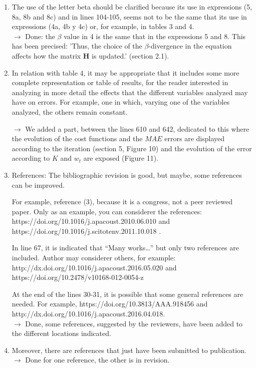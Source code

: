 \documentclass[10pt]{article}
\begin{document}
\begin{enumerate}
\item The use of the letter beta should be clarified because its use in expressions (5, 8a, 8b and 8c) and in lines 104-105, seems not to be the same that its use in expressions (4a, 4b y 4c) or, for example, in tables 3 and 4.\\
$\rightarrow$ Done: the $\beta$ value in 4 is the same that in the expressions 5 and 8. This has been precised: 'Thus, the choice of the $\beta$-divergence in the equation affects how the matrix $\mathbf{H}$ is updated.' (section 2.1).

\item In relation with table 4, it may be appropriate that it includes some more complete representation or table of results, for the reader interested in analyzing in more detail the effects that the different variables analyzed may have on errors. For example, one in which, varying one of the variables analyzed, the others remain constant.

$\rightarrow$ We added a part, between the lines 610 and 642, dedicated to this where the evolution of the cost functions and the $MAE$ errors are displayed according to the iteration (section 5, Figure 10) and the evolution of the error according to $K$ and $w_t$ are exposed (Figure 11).

\item References: The bibliographic revision is good, but maybe, some references can be improved.

For example, reference (3), because it is a congress, not a peer reviewed paper. Only as an example, you can considerer the references: https://doi.org/10.1016/j.apacoust.2010.06.010 and https://doi.org/10.1016/j.scitotenv.2011.10.018 .

In line 67, it is indicated that “Many works…” but only two references are included. Author may considerer others, for example: 
http://dx.doi.org/10.1016/j.apacoust.2016.05.020 and https://doi.org/10.2478/v10168-012-0054-z

At the end of the lines 30-31, it is possible that some general references are needed. For example, 
https://doi.org/10.3813/AAA.918456 and http://dx.doi.org/10.1016/j.apacoust.2016.04.018.\\
$\rightarrow$ Done, some references, suggested by the reviewers, have been added to the different locations indicated.


\item Moreover, there are references that just have been submitted to publication. \\
$\rightarrow$ Done for one reference, the other is in revision.

\end{enumerate}
\end{document}

